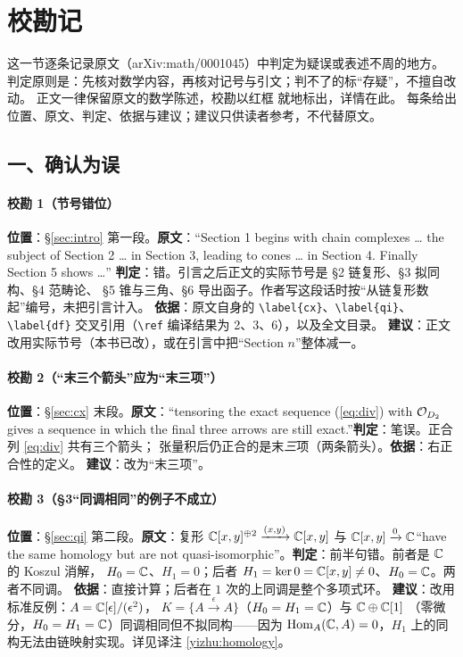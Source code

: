 \section{校勘记}\label{app:errata}

这一节逐条记录原文（arXiv:math/0001045）中判定为疑误或表述不周的地方。
判定原则是：先核对数学内容，再核对记号与引文；判不了的标“存疑”，不擅自改动。
正文一律保留原文的数学陈述，校勘以红框  就地标出，详情在此。
每条给出位置、原文、判定、依据与建议；建议只供读者参考，不代替原文。

\subsection*{一、确认为误}

\paragraph{校勘 1（节号错位）}
\textbf{位置}：§\ref{sec:intro} 第一段。\textbf{原文}：“Section 1 begins with
chain complexes \ldots{} the subject of Section 2 \ldots{} in Section 3,
leading to cones \ldots{} in Section 4. Finally Section 5 shows \ldots{}”
\textbf{判定}：错。引言之后正文的实际节号是 §2 链复形、§3 拟同构、§4 范畴论、
§5 锥与三角、§6 导出函子。作者写这段话时按“从链复形数起”编号，未把引言计入。
\textbf{依据}：原文自身的 \verb|\label{cx}|、\verb|\label{qi}|、\verb|\label{df}|
交叉引用（\verb|\ref| 编译结果为 2、3、6），以及全文目录。
\textbf{建议}：正文改用实际节号（本书已改），或在引言中把“Section $n$”整体减一。

\paragraph{校勘 2（“末三个箭头”应为“末三项”）}
\textbf{位置}：§\ref{sec:cx} 末段。\textbf{原文}：“tensoring the exact sequence
(\ref{eq:div}) with $\mathcal{O}_{D_2}$ gives a sequence in which the final three
arrows are still exact.”\textbf{判定}：笔误。正合列 \eqref{eq:div} 共有三个箭头；
张量积后仍正合的是末\emph{三}项（两条箭头）。\textbf{依据}：右正合性的定义。
\textbf{建议}：改为“末三项”。

\paragraph{校勘 3（§3“同调相同”的例子不成立）}
\textbf{位置}：§\ref{sec:qi} 第二段。\textbf{原文}：复形
$\mathbb{C}[x,y]^{\oplus 2}\xrightarrow{(x,y)}\mathbb{C}[x,y]$ 与
$\mathbb{C}[x,y]\xrightarrow{0}\mathbb{C}$“have the same homology but are not
quasi-isomorphic”。\textbf{判定}：前半句错。前者是 $\mathbb{C}$ 的 Koszul 消解，
$H_0=\mathbb{C}$、$H_1=0$；后者 $H_1=\ker 0=\mathbb{C}[x,y]\ne0$、$H_0=\mathbb{C}$。两者不同调。
\textbf{依据}：直接计算；后者在 $1$ 次的上同调是整个多项式环。
\textbf{建议}：改用标准反例：$A=\mathbb{C}[\epsilon]/(\epsilon^2)$，
$K=\{A\xrightarrow{\epsilon}A\}$（$H_0=H_1=\mathbb{C}$）与 $\mathbb{C}\oplus\mathbb{C}[1]$
（零微分，$H_0=H_1=\mathbb{C}$）同调相同但不拟同构——因为
$\operatorname{Hom}_A(\mathbb{C},A)=0$，$H_1$ 上的同构无法由链映射实现。详见译注
\ref{yizhu:homology}。


